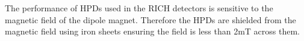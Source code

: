 The performance of HPDs used in the RICH detectors is sensitive to the magnetic field of the dipole magnet.
Therefore the HPDs are shielded from the magnetic field using iron sheets ensuring the field is less than 2mT across them. %





 
